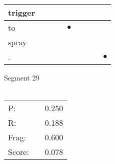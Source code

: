 \documentclass[landscape]{article}
\newcommand{\ssp}{\hspace{2pt}}
\newcommand{\mex}{\cellcolor{g}$\bullet$}
\begin{document}
\begin{tabular}{|l|p{10pt}|p{10pt}|p{10pt}|p{10pt}|p{10pt}|p{10pt}|p{10pt}|p{10pt}|}
\hline
\ssp trigger \ssp&\hspace{2pt}&\hspace{2pt}&\hspace{2pt}&\hspace{2pt}&\hspace{2pt}&\hspace{2pt}&\hspace{2pt}&\hspace{2pt}\\
\hline
\ssp \cellcolor{ref3}to \ssp&\hspace{2pt}&\hspace{2pt}&\hspace{2pt}&\hspace{2pt}\mex&\hspace{2pt}&\hspace{2pt}&\hspace{2pt}&\hspace{2pt}\\
\hline
\ssp spray \ssp&\hspace{2pt}&\hspace{2pt}&\hspace{2pt}&\hspace{2pt}&\hspace{2pt}&\hspace{2pt}&\hspace{2pt}&\hspace{2pt}\\
\hline
\ssp \cellcolor{ref7}. \ssp&\hspace{2pt}&\hspace{2pt}&\hspace{2pt}&\hspace{2pt}&\hspace{2pt}&\hspace{2pt}&\hspace{2pt}&\hspace{2pt}\mex\\
\hline
\end{tabular}

\vspace{6pt}
\noindent Segment 29\\\\
\noindent\begin{tabular}{lm{12pt}r}
\hline
P:&&0.250\\
R:&&0.188\\
Frag:&&0.600\\
Score:&&0.078\\
\end{tabular}
\end{document}
